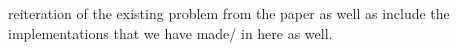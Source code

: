reiteration of the existing problem from the paper as well as include the implementations that we have made/
in here as well.